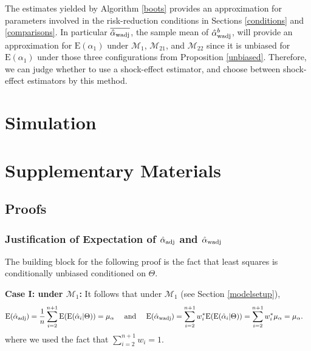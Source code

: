 \documentclass[11pt]{article}
\def\mc#1{\mathcal{#1}} %
\def\E#1{\mathrm{E}(#1)} %
\theoremstyle{definition}
\begin{document}
The estimates yielded by Algorithm \ref{boots} provides an approximation for parameters involved in the risk-reduction conditions in Sections \ref{conditions} and \ref{comparisons}. In particular $\overline{\hat{\alpha}_{\rm wadj}}$, the sample mean of $\hat{\alpha}_{\rm wadj}^{b}$, will provide an approximation for $\E{\alpha_1}$ under $\mc{M}_1$, $\mc{M}_{21}$, and $\mc{M}_{22}$ since it is unbiased for $\E{\alpha_1}$ under those three configurations from Proposition \ref{unbiased}. Therefore, we can judge whether to use a shock-effect estimator, and choose between  shock-effect estimators by this method.



\section{Simulation}

\label{simulation}


\section{Supplementary Materials}

\subsection{Proofs}

\label{proofs}

\subsubsection{Justification of Expectation of $\hat{\alpha}_{\rm adj}$ and $\hat{\alpha}_{\rm wadj}$}
\label{exp}

The building block for the following proof is the fact that least squares is conditionally unbiased conditioned on $\Theta$. 

\noindent \textbf{Case I: under $\mc{M}_{1}$:} It follows that  under $\mc{M}_{1}$ (see Section \ref{modelsetup}),
\begin{align*}
\E{\hat{\alpha}_{\rm adj}} =\frac{1}{n}  \sum_{i=2}^{n+1} \E{\E{\hat{\alpha}_i|\Theta}} = \mu_{\alpha} 
\quad \text{ and } \quad \E{\hat{\alpha}_{\rm wadj}}&= \sum_{i=2}^{n+1} w_i^* \E{\E{\hat{\alpha}_i|\Theta}}= \sum_{i=2}^{n+1} w_i^*\mu_{\alpha}= \mu_{\alpha}.
\end{align*}
where we used the fact that $\sum_{i=2}^{n+1} w_i=1$. 
\end{document}
